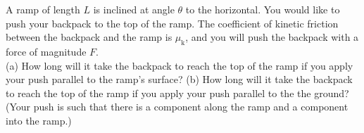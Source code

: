 A ramp of length $L$ is inclined at angle $\theta$ to the horizontal.
You would like to push your backpack to the top of the ramp. The
coefficient of kinetic friction between the backpack and the ramp is
$\mu_\text{k}$, and you will push the backpack with a force of
magnitude $F$.\\
%
(a) How long will it take the backpack to reach the top of the ramp if
you apply your push parallel to the ramp's surface?\hwendpart
%
(b) How long will it take the backpack to reach the top of the ramp if
you apply your push parallel to the the ground? (Your push is such
that there is a component along the ramp and a component into the
ramp.)
